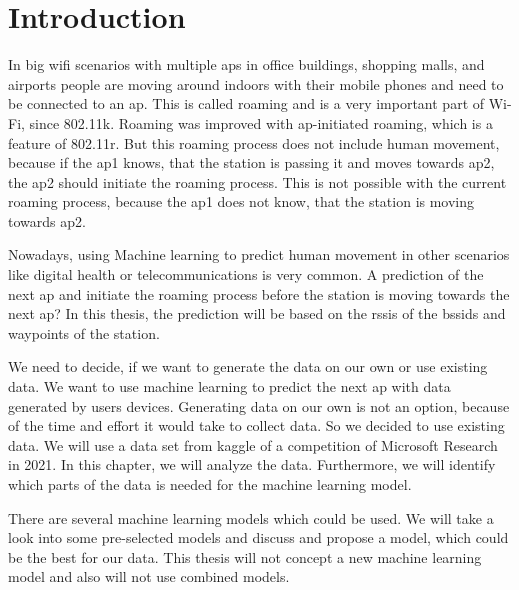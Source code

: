 \chapter{Introduction}\label{sec:intro}



In big \ac{wifi} scenarios with multiple \acp{ap} in office buildings, shopping malls, and airports people are moving around indoors with their mobile phones and need to be connected to an \ac{ap}.
This is called roaming and is a very important part of Wi-Fi, since 802.11k\cite{802.11k}.
Roaming was improved with \ac{ap}-initiated roaming, which is a feature of 802.11r\cite{802.11r}.
But this roaming process does not include human movement, because if the \ac{ap}1 knows, that the station is passing it and moves towards \ac{ap}2, the \ac{ap}2 should initiate the roaming process.
This is not possible with the current roaming process, because the \ac{ap}1 does not know, that the station is moving towards \ac{ap}2.

Nowadays, using Machine learning to predict human movement in other scenarios like digital health or telecommunications is very common.
A prediction of the next \ac{ap} and initiate the roaming process before the station is moving towards the next \ac{ap}?
In this thesis, the prediction will be based on the \acp{rssi} of the \acp{bssid} and waypoints of the station.

We need to decide, if we want to generate the data on our own or use existing data.
We want to use machine learning to predict the next \ac{ap} with data generated by users devices.
Generating data on our own is not an option, because of the time and effort it would take to collect data.
So we decided to use existing data.
We will use a data set from kaggle\cite{kaggle} of a competition of Microsoft Research in 2021\cite{IndoorLocationNavigation}.
In this chapter, we will analyze the data.
Furthermore, we will identify which parts of the data is needed for the machine learning model.

There are several machine learning models which could be used.
We will take a look into some pre-selected models and discuss and propose a model, which could be the best for our data.
This thesis will not concept a new machine learning model and also will not use combined models.

